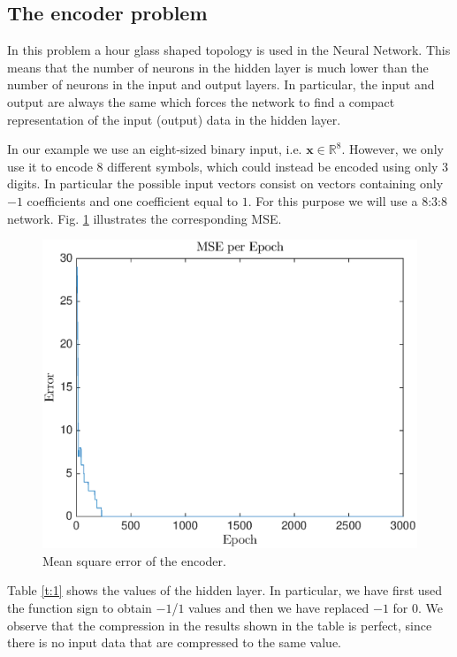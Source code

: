 \documentclass[letterpaper, 10 pt, conference]{ieeeconf}  %
\begin{document}
\subsection{The encoder problem}
In this problem a hour glass shaped topology is used in the Neural Network. This means that the number of neurons in the hidden layer is much lower than the number of neurons in the input and output layers. In particular, the input and output are always the same which forces the network to find a compact representation of the input (output) data in the hidden layer. 

In our example we use an eight-sized binary input, i.e. $\textbf{x} \in \mathbb{R}^8$. However, we only use it to encode 8 different symbols, which could instead be encoded using only 3 digits. In particular the possible input vectors consist on vectors containing only $-1$ coefficients and one coefficient equal to $1$. For this purpose we will use a 8:3:8 network. Fig. \ref{f:enc} illustrates the corresponding MSE. 


\begin{figure}[h]
\centering
\includegraphics[scale=0.4]{encoder}
\caption{Mean square error of the encoder.}
\label{f:enc}
\end{figure}




Table \ref{t:1} shows the values of the hidden layer. In particular, we have first used the function sign to obtain $-1$/$1$ values and then we have replaced $-1$ for $0$. We observe that the compression in the results shown in the table is perfect, since there is no input data that are compressed to the same value.
\end{document}
